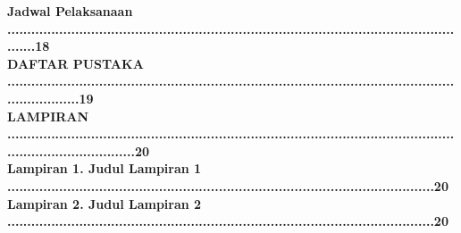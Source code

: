 \textbf{\indent {} Jadwal Pelaksanaan .......................................................................................................................18}\\
\textbf{\indent DAFTAR PUSTAKA ..................................................................................................................................19}\\
\textbf{\indent LAMPIRAN ................................................................................................................................................20}\\
\textbf{\indent \indent Lampiran 1. Judul Lampiran 1 ...........................................................................................................20}\\
\textbf{\indent \indent Lampiran 2. Judul Lampiran 2 ...........................................................................................................20}\\



